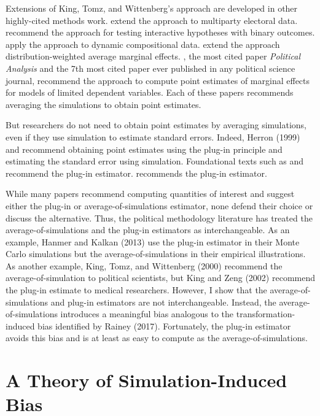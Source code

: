 \documentclass[12pt]{article}
\begin{document}
Extensions of King, Tomz, and Wittenberg's approach are developed in other highly-cited methods work. \cite{Tomz2002} extend the approach to multiparty electoral data. \cite{BerryDeMerittEsarey2010} recommend the approach for testing interactive hypotheses with binary outcomes. \cite{Philips2016} apply the approach to dynamic compositional data. \cite{Zhirnov2022} extend the approach distribution-weighted average marginal effects. \cite{BramborClarkGolder2006}, the most cited paper \textit{Political Analysis} and the 7th most cited paper ever published in any political science journal, recommend the approach to compute point estimates of marginal effects for models of limited dependent variables. Each of these papers recommends averaging the simulations to obtain point estimates.

But researchers do not need to obtain point estimates by averaging simulations, even if they use simulation to estimate standard errors. Indeed, Herron (1999) and \cite{KingZeng2002} recommend obtaining point estimates using the plug-in principle and estimating the standard error using simulation. Foundational texts such as \citet[pp.\@ 320--321]{CasellaBerger2002} and \citet[p.\@ 521]{Greene2012} recommend the plug-in estimator. \cite{King1989} recommends the plug-in estimator. 

While many papers recommend computing quantities of interest and suggest either the plug-in or average-of-simulations estimator, none defend their choice or discuss the alternative. Thus, the political methodology literature has treated the average-of-simulations and the plug-in estimators as interchangeable. As an example, Hanmer and Kalkan (2013) use the plug-in estimator in their Monte Carlo simulations but the average-of-simulations in their empirical illustrations. As another example, King, Tomz, and Wittenberg (2000) recommend the average-of-simulation to political scientists, but King and Zeng (2002) recommend the plug-in estimate to medical researchers. However, I show that the average-of-simulations and plug-in estimators are not interchangeable. Instead, the average-of-simulations introduces a meaningful bias analogous to the transformation-induced bias identified by Rainey (2017). Fortunately, the plug-in estimator avoids this bias and is at least as easy to compute as the average-of-simulations.

\section*{A Theory of Simulation-Induced Bias}
\end{document}
